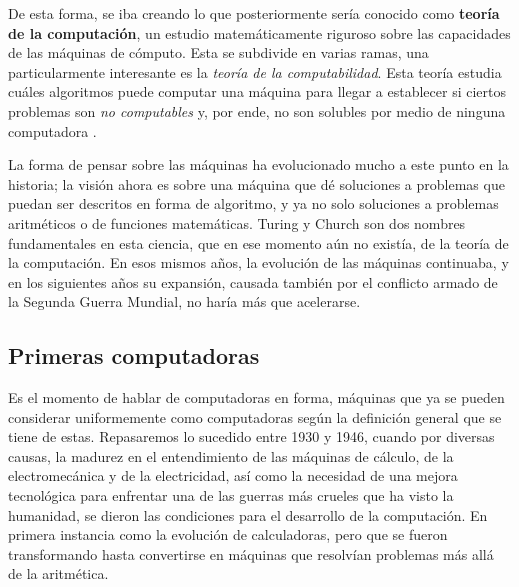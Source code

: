 \documentclass[letterpaper,12pt,oneside]{book}
\begin{document}
        De esta forma, se iba creando lo que posteriormente sería conocido como \textbf{teoría de la computación}, un estudio  matemáticamente riguroso
		sobre las capacidades de las máquinas de cómputo. Esta se subdivide en varias ramas, una particularmente interesante es la \textit{teoría de la computabilidad}. Esta teoría estudia
		cuáles algoritmos puede computar una máquina para llegar a establecer si ciertos problemas son \textit{no computables} y, por ende, no son solubles por medio de ninguna computadora \cite[p. 272]{ifrah_universal_2001}.
		
		La forma de pensar sobre las máquinas ha evolucionado mucho a este punto en la historia; la visión ahora es sobre una máquina que dé soluciones a problemas que
		puedan ser descritos en forma de algoritmo, y ya no solo soluciones a problemas aritméticos o de funciones matemáticas. Turing y Church
		son dos nombres fundamentales en esta ciencia, que en ese momento aún no existía, de la teoría de la computación. En esos mismos años, la evolución
		de las máquinas continuaba, y en los siguientes años su expansión, causada también por el conflicto armado
		de la Segunda Guerra Mundial, no haría más que acelerarse.
		
		\clearpage		
		\subsection{Primeras computadoras}
		
		Es el momento de hablar de computadoras en forma, máquinas que ya se pueden considerar uniformemente como computadoras según la definición general
		que se tiene de estas. Repasaremos lo sucedido entre 1930 y 1946, cuando por diversas causas, la madurez en el entendimiento de las
		máquinas de cálculo, de la electromecánica y de la electricidad, así como la necesidad de una mejora tecnológica para enfrentar una de las guerras
		más crueles que ha visto la humanidad, se dieron las condiciones para el desarrollo de la computación. En primera instancia
		como la evolución de calculadoras, pero que se fueron transformando hasta convertirse en máquinas que resolvían problemas más allá de 
		la aritmética.
		
\end{document}
